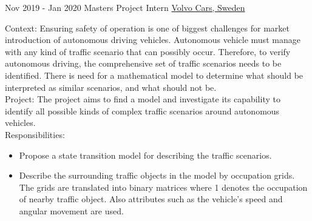 \documentclass[letterpaper]{templatecv} %
\begin{document}
\begin{twenty}
      
      \twentyitem
    	{Nov 2019 -}
		{Jan 2020}
        {Masters Project Intern}
        {\href{http://www.volvocars.com/}{Volvo Cars, Sweden}}
        {}
        {Context: Ensuring safety of operation is one of biggest challenges for market introduction of autonomous driving vehicles. Autonomous vehicle must manage with any kind of traffic scenario that can possibly occur. Therefore, to verify autonomous driving, the comprehensive set of traffic scenarios needs to be identified. There is need for a mathematical model to determine what should be interpreted as similar scenarios, and what should not be.\\ 
        Project: The project aims to find a model and investigate its capability to identify all possible kinds of complex traffic scenarios around autonomous vehicles.\\
        Responsibilities:
\begin{itemize}
\item Propose a state transition model for describing the traffic scenarios.
\item Describe the surrounding traffic objects in the model by occupation grids. The grids are translated into binary matrices where 1 denotes the
occupation of nearby traffic object. Also attributes such as the vehicle’s speed and angular movement are used.
\end{itemize}}
           \end{twenty}
        \newpage
\makenewprofile
\end{document}
